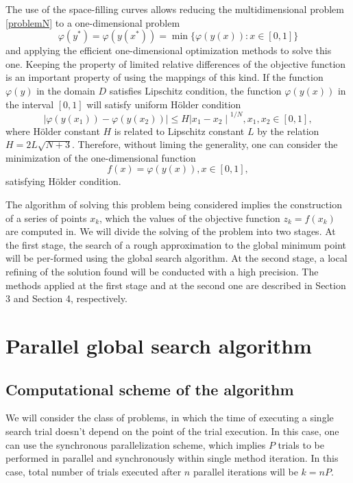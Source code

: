 \documentclass[runningheads]{llncs}
\begin{document}
The use of the space-filling curves allows reducing the multidimensional problem \ref{problemN} to a one-dimensional problem 
\begin{equation} \label{problem_ref}
\varphi(y^*) = \varphi(y(x^*)) = \min{\{ \varphi(y(x)): x \in [0, 1] \}}
\end{equation}
and applying the efficient one-dimensional optimization methods to solve this one. Keeping the property of limited relative differences of the objective function is an important property of using the mappings of this kind. If the function $\varphi(y)$ in the domain $D$ satisfies Lipschitz condition, the function $\varphi(y(x))$ in the interval $[0,1]$ will satisfy uniform H{\"o}lder condition
\begin{equation} \label{hölder_ref}
\mid \varphi(y(x_1)) - \varphi(y(x_2)) \mid \leq H {\mid x_1 - x_2 \mid}^{1/N}, x_1, x_2 \in [0,1],
\end{equation}
where H{\"o}lder constant $H$ is related to Lipschitz constant $L$ by the relation $H = 2L\sqrt{N+3}$. Therefore, without liming the generality, one can consider the minimization of the one-dimensional function 
\begin{equation} \label{minim_fun_ref}
f(x) = \varphi(y(x)), x \in [0,1],
\end{equation}
satisfying H{\"o}lder condition.

The algorithm of solving this problem being considered implies the construction of a series of points $x_k$, which the values of the objective function  $z_k = f(x_k)$ are computed in. We will divide the solving of the problem into two stages. At the first stage, the search of a rough approximation to the global minimum point will be per-formed using the global search algorithm. At the second stage, a local refining of the solution found will be conducted with a high precision. The methods applied at the first stage and at the second one are described in Section 3 and Section 4, respectively.

\section{Parallel global search algorithm}
\subsection{Computational scheme of the algorithm}

We will consider the class of problems, in which the time of executing a single search trial doesn’t depend on the point of the trial execution. In this case, one can use the synchronous parallelization scheme, which implies $P$ trials to be performed in parallel and synchronously within single method iteration. In this case, total number of trials executed after $n$ parallel iterations will be $k=nP$.
\end{document}
